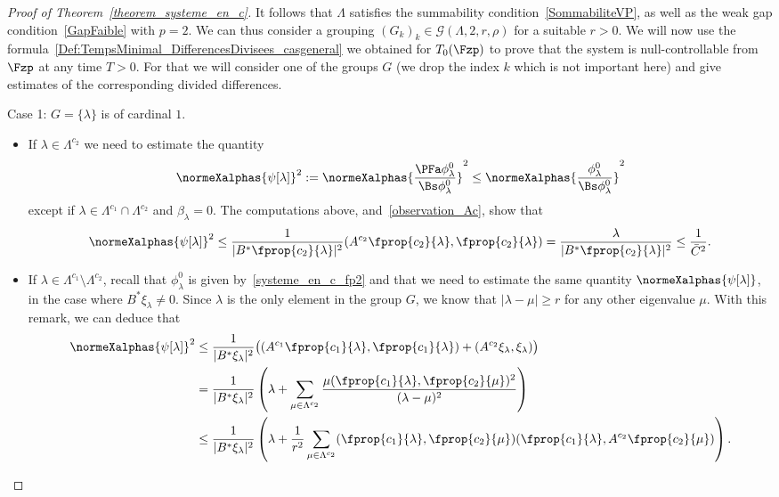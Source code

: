 \begin{proof}[Proof of Theorem~\ref{theorem_systeme_en_c}]
It follows that $\Lambda$ satisfies the summability condition~\eqref{SommabiliteVP}, as well as the weak gap condition~\eqref{GapFaible} with $p=2$. We can thus consider a grouping $(G_k)_k\in \mathcal{G}(\Lambda,2,r,\rho)$ for a suitable $r>0$. We will now use the formula~\eqref{Def:TempsMinimal_DifferencesDivisees_casgeneral} we obtained for $T_0(\Fzp)$ to prove that the system is null-controllable from $\Fzp$ at any time $T>0$. For that we will consider one of the groups $G$ (we drop the index $k$ which is not important here) and give estimates of the corresponding divided differences.
\begin{step}{Case 1:} $G=\{\lambda\}$ is of cardinal $1$.
\begin{itemize}
\item If $\lambda\in \Lambda^{c_2}$ we need to estimate the quantity
\[
\normeXalphas{\psi[\lambda]}^2:=\normeXalphas{\frac{\PFa \phi_\lambda^0}{\Bs \phi_\lambda^0}}^2\leq \normeXalphas{\frac{\phi_\lambda^0}{\Bs \phi_\lambda^0}}^2
\]
except if $\lambda\in \Lambda^{c_1}\cap \Lambda^{c_2}$ and $\beta_\lambda=0$. The computations above, and~\eqref{observation_Ac}, show that
\[
\normeXalphas{\psi[\lambda]}^2\leq \frac{1}{|B^* \fprop{c_2}{\lambda}|^2} (A^{c_2} \fprop{c_2}{\lambda},\fprop{c_2}{\lambda}) = \frac{\lambda}{|B^* \fprop{c_2}{\lambda}|^2} \leq \frac{1}{\bar{C}^2}.
\]
\item If $\lambda\in \Lambda^{c_1}\setminus \Lambda^{c_2}$, recall that $\phi_\lambda^0$ is given by~\eqref{systeme_en_c_fp2} and that we need to estimate the same quantity $\normeXalphas{\psi[\lambda]}$, in the case where $B^*\xi_\lambda\neq 0$. Since $\lambda$ is the only element in the group $G$, we know that $|\lambda-\mu|\geq r$ for any other eigenvalue $\mu$. With this remark, we can deduce that
\begin{align*}
\normeXalphas{\psi[\lambda]}^2 & \leq \frac{1}{|B^* \xi_\lambda|^2} \big((A^{c_1}\fprop{c_1}{\lambda},\fprop{c_1}{\lambda}) + (A^{c_2} \xi_\lambda,\xi_\lambda) \big)\\
& = \frac{1}{|B^* \xi_\lambda|^2} \left(\lambda + \sum_{\mu\in \Lambda^{c_2}} \frac{\mu(\fprop{c_1}{\lambda},\fprop{c_2}{\mu})^2}{(\lambda-\mu)^2} \right) \\
& \leq \frac{1}{|B^* \xi_\lambda|^2} \left(\lambda + \frac{1}{r^2}\sum_{\mu\in \Lambda^{c_2}} (\fprop{c_1}{\lambda},\fprop{c_2}{\mu}) (\fprop{c_1}{\lambda},A^{c_2} \fprop{c_2}{\mu}) \right).
\end{align*}



\end{itemize}
\end{step}
\end{proof}
